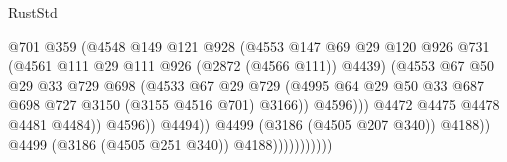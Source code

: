 \begin{lexlean}{RustStd}
\begin{coremodule}
{\begin{coremodule}
{{{{{{{{{{{{{{{{{{{{                                          @701
                                          @359
                                          (@4548
                                            @149
                                            @121
                                            @928
                                            (@4553
                                              @147
                                              @69
                                              @29
                                              @120
                                              @926
                                              @731
                                              (@4561 @111 @29 @111 @926 (@2872 (@4566 @111)) @4439)
                                              (@4553
                                                @67
                                                @50
                                                @29
                                                @33
                                                @729
                                                @698
                                                (@4533
                                                  @67
                                                  @29
                                                  @729
                                                  (@4995
                                                    @64
                                                    @29
                                                    @50
                                                    @33
                                                    @687
                                                    @698
                                                    @727
                                                    @3150
                                                    (@3155 @4516 @701)
                                                    @3166))
                                                @4596)))
                                          @4472
                                          @4475
                                          @4478
                                          @4481
                                          @4484))
                                      @4596))
                                  @4494))
                              @4499
                              (@3186 (@4505 @207 @340))
                              @4188))
                          @4499
                          (@3186 (@4505 @251 @340))
                          @4188)))))))))))
}}}}}}}}}}}}}}}}}}}}
\end{coremodule}}
\end{coremodule}
\end{lexlean}
